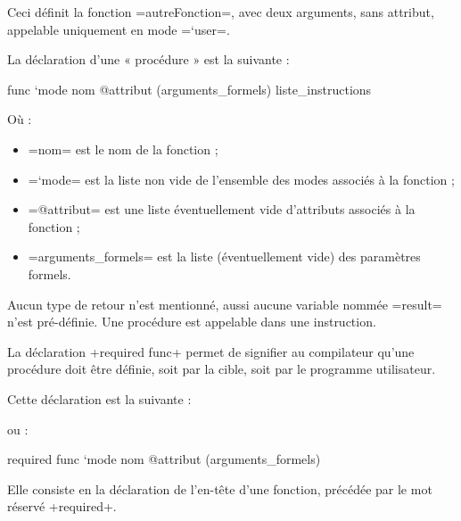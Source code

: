 Ceci définit la fonction \plm=autreFonction=, avec deux arguments, sans attribut, appelable uniquement en mode \plm=`user=.





La déclaration d'une « procédure » est la suivante :
\begin{PLM}
func `mode nom @attribut (arguments_formels) {
  liste_instructions
}
\end{PLM}
Où :
\begin{itemize}
  \item \plm=nom= est le nom de la fonction ;
  \item \plm=`mode= est la liste non vide de l'ensemble des modes associés à la fonction ;
  \item \plm=@attribut= est une liste éventuellement vide d'attributs associés à la fonction ;
  \item \plm=arguments_formels= est la liste (éventuellement vide) des paramètres formels.
\end{itemize}

Aucun type de retour n'est mentionné, aussi aucune variable nommée \plm=result= n'est pré-définie. Une procédure est appelable dans une instruction.











La déclaration \plm+required func+ permet de signifier au compilateur qu'une procédure doit être définie, soit par la cible, soit par le programme utilisateur.

Cette déclaration est la suivante :

ou :

\begin{PLM}
required func `mode nom @attribut (arguments_formels)
\end{PLM}

Elle consiste en la déclaration de l'en-tête d'une fonction, précédée par le mot réservé \plm+required+.







